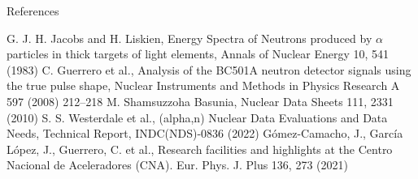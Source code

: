 \documentclass[11pt]{beamer}
\newcommand{\an}{($\alpha$,n) }
\begin{document}
\begin{frame}{References}
\begin{thebibliography}{5}
	G. J. H. Jacobs and H. Liskien, Energy Spectra of Neutrons produced by $\alpha$ particles in thick targets of light elements, Annals of Nuclear Energy 10, 541 (1983)
	C. Guerrero et al., Analysis of the BC501A neutron detector signals using the true pulse shape, Nuclear Instruments and Methods in Physics Research A 597 (2008) 212–218
	M. Shamsuzzoha Basunia, Nuclear Data Sheets 111, 2331 (2010)
	S. S. Westerdale et al., (alpha,n) Nuclear Data Evaluations and Data Needs, Technical Report, INDC(NDS)-0836 (2022)
	Gómez-Camacho, J., García López, J., Guerrero, C. et al., Research facilities and highlights at the Centro Nacional de Aceleradores (CNA). Eur. Phys. J. Plus 136, 273 (2021)
\end{thebibliography}
\end{frame}
\end{document}
